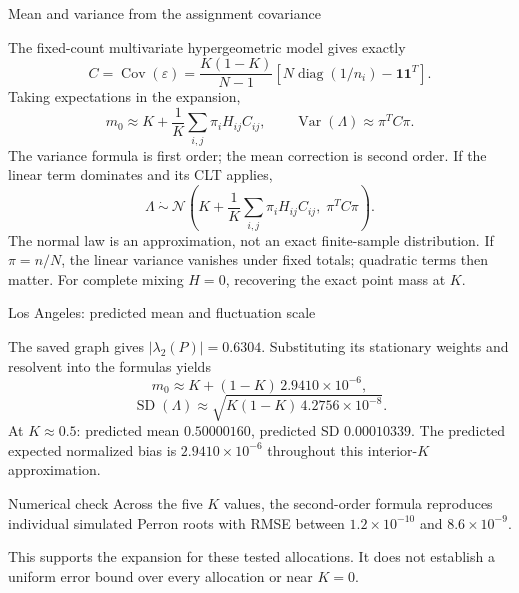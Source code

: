 \documentclass[aspectratio=169,10pt]{beamer}
\begin{document}
\begin{frame}{Mean and variance from the assignment covariance}
\small

The fixed-count multivariate hypergeometric model gives exactly
\[
 C=\operatorname{Cov}(\varepsilon)
 =\frac{K(1-K)}{N-1}\left[N\operatorname{diag}(1/n_i)-\mathbf1\mathbf1^T\right].
\]
Taking expectations in the expansion,
\[
 \boxed{m_0\approx K+\frac1K\sum_{i,j}\pi_iH_{ij}C_{ij}},\qquad
 \boxed{\operatorname{Var}(\Lambda)\approx\pi^TC\pi.}
\]
The variance formula is first order; the mean correction is second order.
\medskip
If the linear term dominates and its CLT applies,
\[
 \Lambda\ \dot\sim\ \mathcal N\!\left(K+\frac1K\sum_{i,j}\pi_iH_{ij}C_{ij},\;\pi^TC\pi\right).
\]
\footnotesize The normal law is an approximation, not an exact finite-sample distribution. If $\pi=n/N$, the linear variance vanishes under fixed totals; quadratic terms then matter. For complete mixing $H=0$, recovering the exact point mass at $K$.

\end{frame}

\begin{frame}{Los Angeles: predicted mean and fluctuation scale}
\small

The saved graph gives $|\lambda_2(P)|=0.6304$. Substituting its stationary weights and resolvent into the formulas yields
\[
 \boxed{m_0\approx K+(1-K)\,2.9410\times10^{-6}},
\]
\[
 \boxed{\operatorname{SD}(\Lambda)\approx
 \sqrt{K(1-K)\,4.2756\times10^{-8}}.}
\]
At $K\approx0.5$: predicted mean $0.50000160$, predicted SD $0.00010339$.
\medskip
The predicted expected normalized bias is $2.9410\times10^{-6}$ throughout this interior-$K$ approximation.
\begin{block}{Numerical check}
Across the five $K$ values, the second-order formula reproduces individual simulated Perron roots with RMSE between $1.2\times10^{-10}$ and $8.6\times10^{-9}$.
\end{block}
\footnotesize This supports the expansion for these tested allocations. It does not establish a uniform error bound over every allocation or near $K=0$.

\end{frame}
\end{document}
